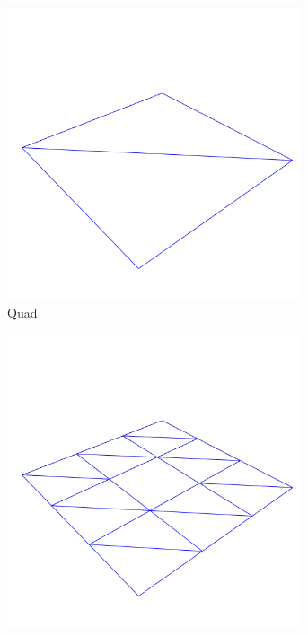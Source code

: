 \documentclass[crop=false,10pt,ngerman]{standalone}
\begin{document}
      \begin{figure}[h]
        \begin{subfigure}[b]{0.24\textwidth}
          \center
          \includegraphics[trim={0 0 0 2cm},clip,width=0.95\textwidth]{images/model-quad-0.png}
          \caption{Quad}
        \end{subfigure}
        \begin{subfigure}[b]{0.24\textwidth}
          \center
          \includegraphics[trim={0 0 0 2cm},clip,width=0.95\textwidth]{images/model-ring-0.png}

\end{subfigure}
\end{figure}
\end{document}
